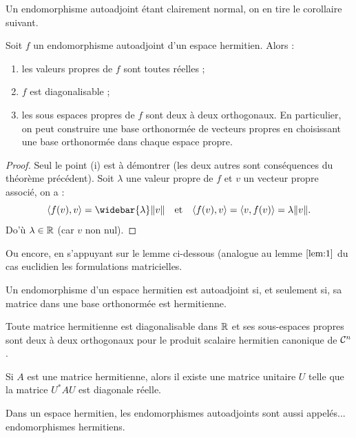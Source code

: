 Un endomorphisme autoadjoint étant clairement normal, on en tire le corollaire suivant.

\begin{coro}
Soit $f$ un endomorphisme autoadjoint d'un espace hermitien. Alors :
\begin{enumerate}[label=(\roman*)]
\item les valeurs propres de $f$ sont toutes réelles ;
\item $f$ est diagonalisable ;
\item les sous espaces propres de $f$ sont deux à deux orthogonaux. En particulier, on peut construire une base orthonormée 
de vecteurs propres en choisissant une base orthonormée dans chaque espace propre.
\end{enumerate}
\end{coro}

\begin{proof}
Seul le point (i) est à démontrer (les deux autres sont conséquences du théorème précédent). Soit $\lambda$ une valeur propre de $f$
et $v$ un vecteur propre associé, on a :
\[ \angl{ f(v) ,v } = \widebar{\lambda} \norm{v} \et \angl{ f(v) ,v } = \angl{v, f(v)} = \lambda \norm{v} . \]
Do'ù $\lambda \in \mathbb{R}$ (car $v$ non nul).
\end{proof}

Ou encore, en s'appuyant sur le lemme ci-dessous (analogue au lemme $\ref{lem:1}$ du cas euclidien les formulations matricielles.

\begin{lem}
Un endomorphisme d'un espace hermitien est autoadjoint si, et seulement si, sa matrice dans une base orthonormée est hermitienne.
\end{lem}

\begin{thm}
Toute matrice hermitienne est diagonalisable dans $\mathbb{R}$ et ses sous-espaces propres sont deux à deux orthogonaux pour le 
produit scalaire hermitien canonique de $\mathcal{C}^n$.
\end{thm}

\begin{thm}
Si $A$ est une matrice hermitienne, alors il existe une matrice unitaire $U$ telle que la matrice $U^{\ast} A U$ est diagonale réelle.
\end{thm}

\begin{rmq}
Dans un espace hermitien, les endomorphismes autoadjoints sont aussi appelés... endomorphismes hermitiens. 
\end{rmq}

